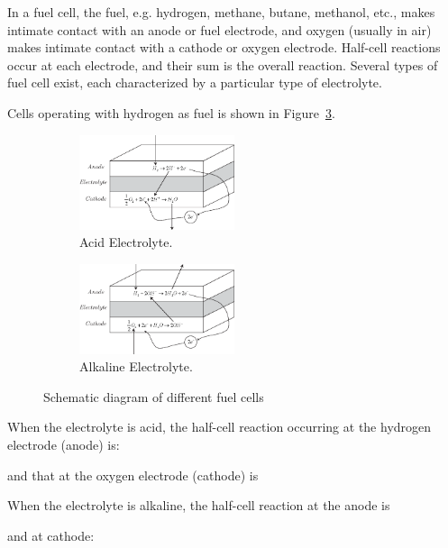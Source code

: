 \documentclass[11pt,a4paper]{article}
\numberwithin{equation}{section}
\theoremstyle{it}
\theoremstyle{definition}
\begin{document}
In a fuel cell, the fuel, e.g. hydrogen, methane, butane, methanol, etc., makes intimate contact with an anode or fuel electrode, and oxygen (usually in air)  makes intimate contact with a cathode or oxygen electrode. Half-cell reactions occur at each electrode, and their sum is the overall reaction. Several types of fuel cell exist, each characterized by a particular type of electrolyte.

Cells operating with hydrogen as fuel is shown in Figure~\ref{pem_fc_2}.
\begin{figure}[H]
	\centering
	\begin{subfigure}{.5\textwidth}
		\centering
		\includegraphics[width = 0.5\textwidth, width = 220pt, keepaspectratio]{figures/pem_fuel_cell/pem_fuel_cell_2.eps}
		\captionsetup{width=0.5\textwidth}		
		\caption{Acid Electrolyte.}
		\label{}
	\end{subfigure}%
	\begin{subfigure}{.5\textwidth}
		\centering
		\includegraphics[width = 0.5\textwidth, width = 220pt, keepaspectratio]{figures/pem_fuel_cell/pem_fuel_cell_3.eps}
		\captionsetup{width=0.5\textwidth}		
		\caption{Alkaline Electrolyte.}
		\label{}
	\end{subfigure}
	\caption{Schematic diagram of different fuel cells}
	\label{pem_fc_2}
\end{figure}
When the electrolyte is acid, the half-cell reaction occurring at the hydrogen electrode (anode) is:
\begin{center}
\end{center}
and that at the oxygen electrode (cathode) is
\begin{center}
\end{center}
When the electrolyte is alkaline, the half-cell reaction at the anode is
\begin{center}
\end{center}
and at cathode:
\begin{center}
\end{center}
\end{document}
